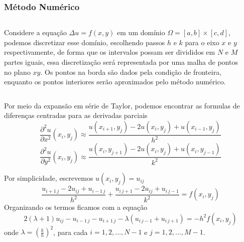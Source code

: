 \documentclass[xcolor=dvipsnames, aspectratio=169]{beamer}
\begin{document}
    \begin{frame}
        \frametitle{Método Numérico}
        \begin{columns}
            \begin{column}{0.6\textwidth}
                Considere a equação $\Delta u = f(x,y)$ em um domínio $\Omega = [a,b] \times [c,d]$, podemos discretizar esse domínio, escolhendo passos $h$ e $k$ para o eixo $x$ e $y$ respectivamente, de forma que os intervalos possam ser divididos em $N$ e $M$ partes iguais, essa discretização será representada por uma malha de pontos no plano $xy$. Os pontos na borda são dados pela condição de fronteira, enquanto os pontos interiores serão aproximados pelo método numérico.    
            \end{column}
            \begin{column}{0.4\textwidth}
            \end{column}
        \end{columns}
    \end{frame}
    \begin{frame}
        Por meio da expansão em série de Taylor, podemos encontrar as formulas de diferenças centradas para as derivadas parciais
        \[
            \dfrac{\partial^2 u}{\partial x^2}(x_i, y_j) \approx \frac{u(x_{i+1}, y_j) - 2u(x_i, y_j) + u(x_{i-1}, y_j)}{h^2} 
        \]
        \[
            \dfrac{\partial^2 u}{\partial y^2}(x_i, y_j) \approx \frac{u(x_i, y_{j+1}) - 2u(x_i, y_j) + u(x_i, y_{j-1})}{k^2}
        \]
    \end{frame}
    \begin{frame}
        Por simplicidade, escrevemos $u(x_i,y_j) = u_{ij}$
        \[
            \frac{u_{i +1 \, j} - 2u_{ij} + u_{i-1\,j}}{h^2} + \frac{u_{i \, j+1} - 2u_{ij} + u_{i \, j-1}}{k^2} = f(x_i, y_j)
        \]
        Organizando os termos ficamos com a equação
        \[
            2\left( \lambda + 1 \right) u_{ij} - u_{i-1 \, j} - u_{i+1 \, j} - \lambda \left( u_{i \, j-1} + u_{i \, j+1} \right) = -h^2 f(x_i, y_j)
        \]
        onde $\lambda = \left( \frac{k}{h} \right)^2$, para cada $i = 1, 2, \dots, N-1$ e $j = 1, 2, \dots, M-1$.
    \end{frame}
\end{document}
